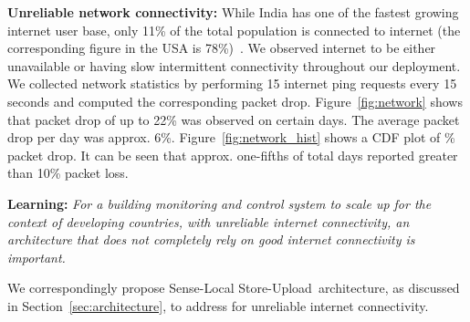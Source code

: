 \documentclass[10pt]{sensys-proc}
\newcommand{\figref}[1]{Figure~\ref{#1}}
\newcommand{\secref}[1]{Section~\ref{#1}}
\newcommand{\paradigms}{Sense-Local Store-Upload~}
\newcommand{\selstups}{SeLStUp }
\begin{document}
\noindent \textbf{Unreliable network connectivity:} While India has one of the fastest growing internet user base, only 11\% of the total population is connected to internet (the corresponding figure in the USA is 78\%)~\cite{meyer}. %
We observed internet to be either unavailable or having slow intermittent connectivity throughout our deployment. We collected network statistics by performing 15 internet ping requests every 15 seconds and computed the corresponding packet drop. \figref{fig:network} shows that packet drop of up to 22\% was observed on certain days. The average packet drop per day was approx. 6\%. \figref{fig:network_hist} shows a CDF plot of \% packet drop. It can be seen that approx. one-fifths of total days reported greater than 10\% packet loss. %

\textbf{Learning:} \emph{For a building monitoring and control system to scale up for the context of developing countries, with unreliable internet connectivity, an architecture that does not completely rely on good internet connectivity is important.} %
%

We correspondingly propose \paradigms architecture, as discussed in \secref{sec:architecture}, to address for unreliable internet connectivity.
\end{document}
